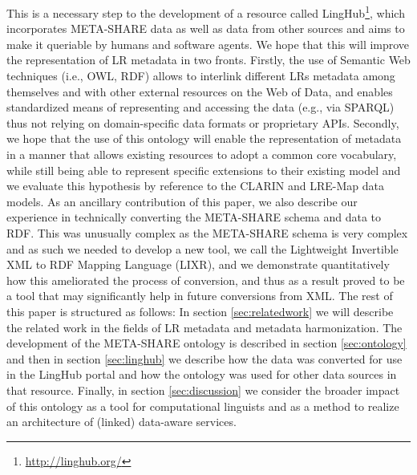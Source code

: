 \documentclass{llncs}
\begin{document}
This is a necessary step to the development of a
resource called LingHub\footnote{\url{http://linghub.org/}}, which incorporates
META-SHARE data as well as data from other sources and aims to make it queriable
by humans and software agents.
We hope that this will improve the representation
of LR metadata in two fronts. Firstly, the use of Semantic Web techniques (i.e., OWL, RDF) allows to
interlink different LRs metadata among themselves and with other external resources on the Web of Data, and enables standardized means of representing and accessing the data (e.g., via SPARQL) thus not relying on domain-specific data formats or proprietary APIs. Secondly, we hope that the use of this ontology will enable the representation of metadata in a manner that allows existing resources to adopt a
common core vocabulary, while still being able to represent specific extensions
to their existing model and we evaluate this hypothesis by reference to the
CLARIN and LRE-Map data models.
As an ancillary contribution of this paper, we also describe our experience in
technically converting the META-SHARE schema and data to RDF. This was unusually
complex as the META-SHARE schema is very complex and as such we needed to
develop a new tool, we call the Lightweight Invertible XML to RDF Mapping
Language (LIXR), and we demonstrate quantitatively how this ameliorated the
process of conversion, and thus as a result proved to be a tool that may
significantly help in future conversions from XML.
The rest of this paper is structured as follows: In section
\ref{sec:relatedwork} we will describe the related work in the fields of
LR metadata and metadata harmonization. The development of the
META-SHARE ontology is described in section \ref{sec:ontology} and then in
section \ref{sec:linghub} we describe how the data was converted for use in the
LingHub portal and how the ontology was used for other data sources in that
resource. Finally, in section \ref{sec:discussion} we consider the broader
impact of this ontology as a tool for computational linguists and as a method to
realize an architecture of (linked) data-aware services.
\end{document}
